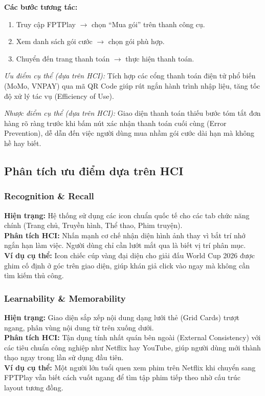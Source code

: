 \medskip\noindent\textbf{Các bước tương tác:}
\begin{enumerate}[leftmargin=2em]
  \item Truy cập FPTPlay $\rightarrow$ chọn ``Mua gói'' trên thanh công cụ.
  \item Xem danh sách gói cước $\rightarrow$ chọn gói phù hợp.
  \item Chuyển đến trang thanh toán $\rightarrow$ thực hiện thanh toán.
\end{enumerate}

\medskip\noindent\textit{Ưu điểm cụ thể (dựa trên HCI):} Tích hợp các cổng thanh toán điện tử phổ biến (MoMo, VNPAY) qua mã QR Code giúp rút ngắn hành trình nhập liệu, tăng tốc độ xử lý tác vụ (Efficiency of Use).

\medskip\noindent\textit{Nhược điểm cụ thể (dựa trên HCI):} Giao diện thanh toán thiếu bước tóm tắt đơn hàng rõ ràng trước khi bấm nút xác nhận thanh toán cuối cùng (Error Prevention), dễ dẫn đến việc người dùng mua nhầm gói cước dài hạn mà không hề hay biết.

\subsection{Phân tích ưu điểm dựa trên HCI}

\subsubsection{Recognition \& Recall}
\textbf{Hiện trạng:} Hệ thống sử dụng các icon chuẩn quốc tế cho các tab chức năng chính (Trang chủ, Truyền hình, Thể thao, Phim truyện).\\
\textbf{Phân tích HCI:} Nhấn mạnh cơ chế nhận diện hình ảnh thay vì bắt trí nhớ ngắn hạn làm việc. Người dùng chỉ cần lướt mắt qua là biết vị trí phân mục.\\
\textbf{Ví dụ cụ thể:} Icon chiếc cúp vàng đại diện cho giải đấu World Cup 2026 được ghim cố định ở góc trên giao diện, giúp khán giả click vào ngay mà không cần tìm kiếm thủ công.

\subsubsection{Learnability \& Memorability}
\textbf{Hiện trạng:} Giao diện sắp xếp nội dung dạng lưới thẻ (Grid Cards) trượt ngang, phân vùng nội dung từ trên xuống dưới.\\
\textbf{Phân tích HCI:} Tận dụng tính nhất quán bên ngoài (External Consistency) với các tiêu chuẩn công nghiệp như Netflix hay YouTube, giúp người dùng mới thành thạo ngay trong lần sử dụng đầu tiên.\\
\textbf{Ví dụ cụ thể:} Một người lớn tuổi quen xem phim trên Netflix khi chuyển sang FPTPlay vẫn biết cách vuốt ngang để tìm tập phim tiếp theo nhờ cấu trúc layout tương đồng.

